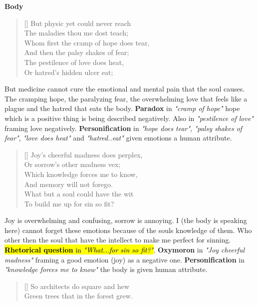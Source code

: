 \documentclass[12pt, a4paper]{article}
\begin{document}
\centerline{\textbf{\large{Body}}}
\begin{verse}[\versewidth]
{\fontverse
But physic yet could never reach\\
The maladies thou me dost teach;\\
Whom first the cramp of hope does tear,\\
And then the palsy shakes of fear;\\
The pestilence of love does heat,\\
Or hatred’s hidden ulcer eat; 
} 
\end{verse}

But medicine cannot cure the emotional and mental pain that the soul
causes. The cramping hope, the paralyzing fear, the overwhelming love
that feels like a plague and the hatred that eats
the body. \textbf{Paradox} in \textit{"cramp of hope"} hope which is a positive
thing is being described negatively. Also in \textit{"pestilence of love"} 
framing love negatively. \textbf{Personification} in
\textit{"hope does tear"}, \textit{"palsy shakes of fear"}, \textit{"love does heat"} and 
\textit{"hatred..eat"} given emotions a human attribute. 

\begin{verse}[\versewidth]
{\fontverse
Joy’s cheerful madness does perplex,\\
Or sorrow’s other madness vex;\\
Which knowledge forces me to know,\\
And memory will not forego.\\
What but a soul could have the wit\\
To build me up for sin so fit? 
} 
\end{verse}

Joy is overwhelming and confusing, sorrow is annoying. I 
(the body is speaking here) cannot forget these emotions because 
of the souls knowledge of them. Who other then the soul that have 
the intellect to make me perfect for sinning. \hl{\textbf{Rhetorical question}
in \textit{"What...for sin so fit?"}}. \textbf{Oxymoron} in \textit{"Joy cheerful madness"}
framing a good emotion (joy) as a negative one. \textbf{Personification}
in \textit{"knowledge forces me to know"} the body is given human attribute.


\begin{verse}[\versewidth]
{\fontverse
So architects do square and hew\\
Green trees that in the forest grew.
} 
\end{verse}
\end{document}
